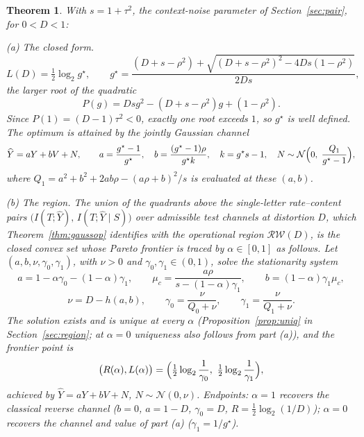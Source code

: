 \documentclass[11pt,onecolumn]{IEEEtran}
\newtheorem{theorem}{Theorem}
\newcommand{\hY}{\widehat{Y}}
\newcommand{\RW}{\mathcal{R}\!\mathcal{W}}
\begin{document}
\begin{theorem}\label{thm:function}\label{thm:region}
With $s=1+\tau^2$, the context-noise parameter of
Section~\ref{sec:pair}, for $0<D<1$:

\emph{(a) The closed form.}
\begin{equation}
L(D)=\tfrac12\log_2 g^\star,\qquad
g^\star=\frac{(D+s-\rho^2)+\sqrt{(D+s-\rho^2)^2-4Ds(1-\rho^2)}}{2Ds},
\label{eq:quadratic}
\end{equation}
the larger root of the quadratic
\begin{equation}
P(g)=Dsg^2-(D+s-\rho^2)g+(1-\rho^2).
\label{eq:Pg}
\end{equation}
Since $P(1)=(D-1)\tau^2<0$, exactly one root exceeds $1$, so $g^\star$
is well defined. The optimum is attained by the jointly Gaussian channel
\begin{equation}
\hY=aY+bV+N,\qquad
a=\frac{g^\star-1}{g^\star},\quad
b=\frac{(g^\star-1)\rho}{g^\star k},\quad
k=g^\star s-1,\quad
N\sim\mathcal N\Bigl(0,\;\frac{Q_1}{g^\star-1}\Bigr),
\label{eq:channel}
\end{equation}
where $Q_1=a^2+b^2+2ab\rho-(a\rho+b)^2/s$ is evaluated at these
$(a,b)$.

\emph{(b) The region.} The union of the quadrants above the single-letter
rate--content pairs
$\bigl(I(T;\hY),\,I(T;\hY\mid S)\bigr)$ over admissible test channels
at distortion $D$, which Theorem~\ref{thm:gaussop} identifies with the
operational region $\RW(D)$, is
the closed convex set whose Pareto frontier is traced by
$\alpha\in[0,1]$ as follows. Let
$(a,b,\nu,\gamma_0,\gamma_1)$, with $\nu>0$ and
$\gamma_0,\gamma_1\in(0,1)$, solve the stationarity system
\begin{equation}
a=1-\alpha\gamma_0-(1-\alpha)\gamma_1,
\qquad
\mu_c=\frac{a\rho}{s-(1-\alpha)\gamma_1},
\qquad
b=(1-\alpha)\gamma_1\mu_c,
\label{eq:twolevel-1}
\end{equation}
\begin{equation}
\nu=D-h(a,b),
\qquad
\gamma_0=\frac{\nu}{Q_0+\nu},
\qquad
\gamma_1=\frac{\nu}{Q_1+\nu}.
\label{eq:twolevel-2}
\end{equation}
The solution exists and is unique at every $\alpha$
(Proposition~\ref{prop:uniq} in Section~\ref{sec:region}; at $\alpha=0$
uniqueness also follows from part (a)), and the frontier point is
\[
\bigl(R(\alpha),L(\alpha)\bigr)
=\Bigl(\tfrac12\log_2\frac1{\gamma_0},\
\tfrac12\log_2\frac1{\gamma_1}\Bigr),
\]
achieved by $\hY=aY+bV+N$, $N\sim\mathcal N(0,\nu)$. Endpoints:
$\alpha=1$ recovers the classical reverse channel ($b=0$, $a=1-D$,
$\gamma_0=D$, $R=\tfrac12\log_2(1/D)$); $\alpha=0$ recovers the channel
and value of part (a) ($\gamma_1=1/g^\star$).
\end{theorem}
\end{document}

